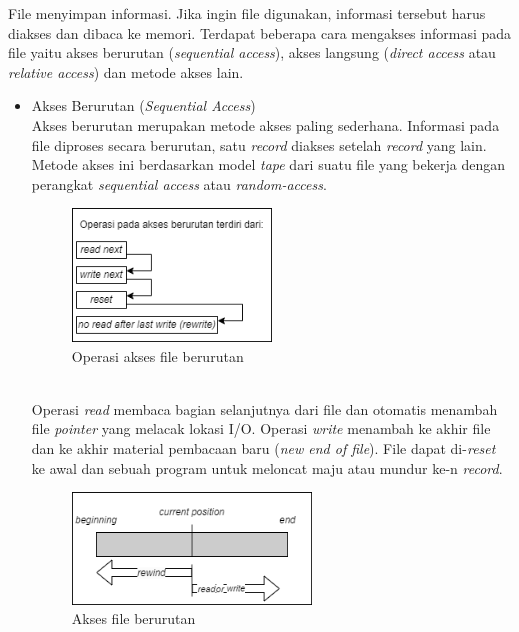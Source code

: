 \documentclass[12pt]{article}
\begin{document}
File menyimpan informasi. Jika ingin file digunakan, informasi tersebut harus diakses dan dibaca ke memori. Terdapat beberapa cara mengakses informasi pada file yaitu akses berurutan (\textit{sequential access}), akses langsung (\textit{direct access} atau \textit{relative access}) dan metode akses lain.
\begin{itemize}
    \item Akses Berurutan (\textit{Sequential Access})
        \\Akses berurutan merupakan metode akses paling sederhana. Informasi pada file diproses secara berurutan, satu \textit{record} diakses setelah \textit{record} yang lain. Metode akses ini berdasarkan model \textit{tape} dari suatu file yang bekerja dengan perangkat \textit{sequential access} atau \textit{random-access}.
        \begin{figure}[h]
			\centering
			\includegraphics[width=0.5\textwidth]{asset/gambar1.png}
            \caption{Operasi akses file berurutan}
        \end{figure}
        \\Operasi \textit{read} membaca bagian selanjutnya dari file dan otomatis menambah file \textit{pointer} yang melacak lokasi I/O. Operasi \textit{write} menambah ke akhir file dan ke akhir material pembacaan baru (\textit{new end of file}). File dapat di-\textit{reset} ke awal dan sebuah program untuk meloncat maju atau mundur ke-n \textit{record}.
        \begin{figure}[h]
			\centering
			\includegraphics[width=0.6\textwidth]{asset/gambar2.png}
            \caption{Akses file berurutan}
        \end{figure}
        \begin{itemize}

\end{itemize}
\end{itemize}
\end{document}
